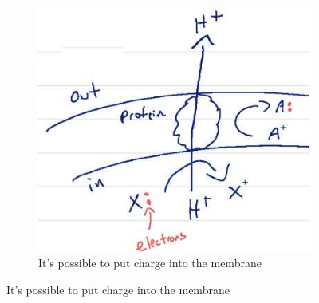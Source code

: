\documentclass[]{article}
\begin{document}
\begin{figure}[H]
\begin{subfigure}[t]{0.3\textwidth}
	\end{subfigure}
	\begin{subfigure}[t]{0.3\textwidth}
		\caption{It’s possible to put charge into the membrane}\label{fig:ProtonPump3}
		\includegraphics[width=\textwidth]{ProtonPump3}
	\end{subfigure}
\end{figure}
\end{document}
